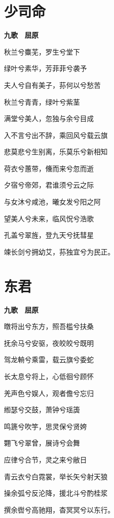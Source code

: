 \documentclass[12pt,a4paper]{ctexbook}
\begin{document}
\section{少司命}
\textbf{九歌　屈原}\par\vspace{0.5em}
秋兰兮麋芜，罗生兮堂下\par
绿叶兮素华，芳菲菲兮袭予\par
夫人兮自有美子，荪何以兮愁苦\par
秋兰兮青青，绿叶兮紫茎\par
满堂兮美人，忽独与余兮目成\par
入不言兮出不辞，乘回风兮载云旗\par
悲莫悲兮生别离，乐莫乐兮新相知\par
荷衣兮蕙带，儵而来兮忽而逝\par
夕宿兮帝郊，君谁须兮云之际\par
与女沐兮咸池，曦女发兮阳之阿\par
望美人兮未来，临风怳兮浩歌\par
孔盖兮翠旌，登九天兮抚彗星\par
竦长剑兮拥幼艾，荪独宜兮为民正。\par

\section{东君}
\textbf{九歌　屈原}\par\vspace{0.5em}
暾将出兮东方，照吾槛兮扶桑\par
抚余马兮安驱，夜皎皎兮既明\par
驾龙輈兮乘雷，载云旗兮委蛇\par
长太息兮将上，心低徊兮顾怀\par
羌声色兮娱人，观者儋兮忘归\par
縆瑟兮交鼓，萧钟兮瑶簴\par
鸣篪兮吹竽，思灵保兮贤姱\par
翾飞兮翠曾，展诗兮会舞\par
应律兮合节，灵之来兮敝日\par
青云衣兮白霓裳，举长矢兮射天狼\par
操余弧兮反沦降，援北斗兮酌桂浆\par
撰余辔兮高驰翔，杳冥冥兮以东行。\par
\end{document}
